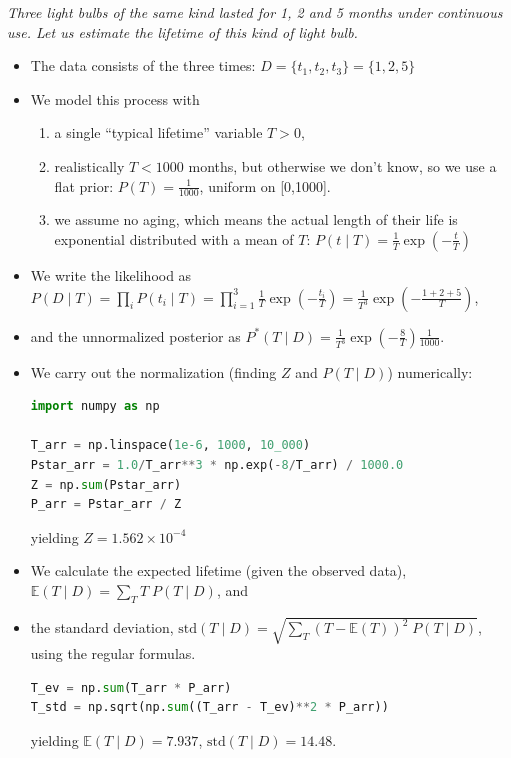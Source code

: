 
\emph{Three light bulbs of the same kind lasted for 1, 2 and 5 months under continuous use. Let us estimate the lifetime of this kind of light bulb.}
\begin{itemize}
	\item The data consists of the three times: $D = \{t_1, t_2, t_3\} = \{1,2,5\}$
	\item We model this process with 
	\begin{enumerate}
		\item a single ``typical lifetime'' variable $T > 0$,
		\item realistically $T < 1000$ months, but otherwise we don't know, so we use a flat prior: $P(T) = \frac{1}{1000}$, uniform on [0,1000].
		\item we assume no aging, which means the actual length of their life is exponential distributed with a mean of $T$: $P(t\;|\;T) = \frac{1}{T}\exp\left(-\frac{t}{T}\right)$
	\end{enumerate}
	\item We write the likelihood as $P(D\;|\;T) = \prod_i P(t_i\;|\; T) = \prod_{i=1}^3 \frac{1}{T}\exp\left(-\frac{t_i}{T}\right) = \frac{1}{T^3} \exp\left(-\frac{1 + 2 + 5}{T}\right)$,
	\item and the unnormalized posterior as $P^\ast(T\;|\;D) = \frac{1}{T^3} \exp\left(-\frac{8}{T}\right) \frac{1}{1000}$.
	\item We carry out the normalization (finding $Z$ and  $P(T\;|\;D)$) numerically:
\begin{lstlisting}[language=python]
import numpy as np

T_arr = np.linspace(1e-6, 1000, 10_000)
Pstar_arr = 1.0/T_arr**3 * np.exp(-8/T_arr) / 1000.0
Z = np.sum(Pstar_arr)
P_arr = Pstar_arr / Z
\end{lstlisting}
	yielding $Z = 1.562\times 10^{-4}$
	\item We calculate the expected lifetime (given the observed data), $\mathbb{E}(T\;|\;D) = \sum_T T \;P(T\;|\;D)$, and
	\item the standard deviation, $\text{std}(T\;|\;D) = \sqrt{\sum_T (T - \mathbb{E}(T))^2 \; P(T\;|\;D)}$, using the regular formulas.
\begin{lstlisting}[language=python]
T_ev = np.sum(T_arr * P_arr)
T_std = np.sqrt(np.sum((T_arr - T_ev)**2 * P_arr))
\end{lstlisting}
	yielding $\mathbb{E}(T\;|\;D) = 7.937$, \quad $\text{std}(T\;|\;D) = 14.48$.
\end{itemize}


